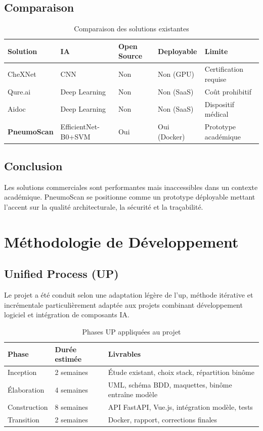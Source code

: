 \documentclass[12pt, a4paper]{report}
\begin{document}
\subsection{Comparaison}

\begin{table}[H]
\centering
\caption{Comparaison des solutions existantes}
\begin{tabularx}{\textwidth}{L{3cm} C{2cm} C{2.5cm} C{2cm} X}
\toprule
\textbf{Solution} & \textbf{IA} & \textbf{Open Source} & \textbf{Deployable} & \textbf{Limite} \\
\midrule
CheXNet \cite{rajpurkar2017} & CNN & Non & Non (GPU) & Certification requise \\
Qure.ai & Deep Learning & Non & Non (SaaS) & Coût prohibitif \\
Aidoc & Deep Learning & Non & Non (SaaS) & Dispositif médical \\
\textbf{PneumoScan} & EfficientNet-B0+SVM & Oui & Oui (Docker) & Prototype académique \\
\bottomrule
\end{tabularx}
\end{table}

\subsection{Conclusion}

Les solutions commerciales sont performantes mais inaccessibles dans un contexte
académique. PneumoScan se positionne comme un prototype déployable mettant
l'accent sur la qualité architecturale, la sécurité et la traçabilité.
\newpage
\section{Méthodologie de Développement}

\subsection{Unified Process (UP)}

Le projet a été conduit selon une adaptation légère de l'\acrfull{up},
méthode itérative et incrémentale particulièrement adaptée aux projets
combinant développement logiciel et intégration de composants IA.

\begin{table}[H]
\centering
\caption{Phases UP appliquées au projet}
\begin{tabularx}{\textwidth}{L{2.5cm} L{3cm} X}
\toprule
\textbf{Phase} & \textbf{Durée estimée} & \textbf{Livrables} \\
\midrule
Inception    & 2 semaines & Étude existant, choix stack, répartition binôme \\
Élaboration  & 4 semaines & UML, schéma BDD, maquettes, binôme entraîne modèle \\
Construction & 8 semaines & API FastAPI, Vue.js, intégration modèle, tests \\
Transition   & 2 semaines & Docker, rapport, corrections finales \\
\bottomrule
\end{tabularx}
\end{table}
\end{document}
